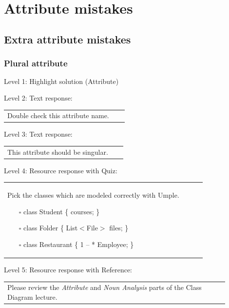 \section{Attribute mistakes}

\subsection{Extra attribute mistakes}

\subsubsection{Plural attribute}

\noindent Level 1: Highlight solution (Attribute) \medskip

\noindent Level 2: Text response: \medskip

\begin{tabular}{|p{0.9\linewidth}}
Double check this attribute name.
\end{tabular} \medskip

\noindent Level 3: Text response: \medskip

\begin{tabular}{|p{0.9\linewidth}}
This attribute should be singular.
\end{tabular} \medskip

\noindent Level 4: Resource response with Quiz: \medskip

\begin{tabular}{|p{0.9\linewidth}}
Pick the classes which are modeled correctly with Umple.

\begin{itemize}
    \item[$\square$] class Student \{ courses; \}
    \item[$\square$] class Folder \{ List$<$File$>$ files; \}
    \item[$\square$] class Restaurant \{ 1 -- * Employee; \}
\end{itemize}

\end{tabular} \medskip

\noindent Level 5: Resource response with Reference: \medskip

\begin{tabular}{|p{0.9\linewidth}}
Please review the \textit{Attribute} and \textit{Noun Analysis} parts of the Class Diagram lecture.
\end{tabular} \medskip



